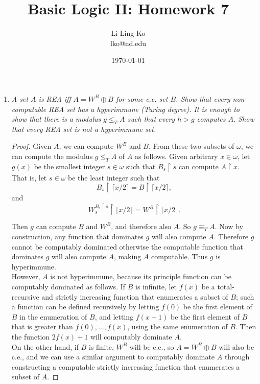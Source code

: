\documentclass{article}
\begin{document}
\title{Basic Logic II: Homework 7}
\author{Li Ling Ko\\ lko@nd.edu}
\date{\today}
\maketitle

\begin{enumerate}
  \item \it A set $A$ is REA iff $A=W^B\oplus B$ for some c.e. set $B$.
    Show that every non-computable REA set has a hyperimmune (Turing
    degree). It is enough to show that there is a modulus $g\leq_TA$ such
    that every $h>g$ computes $A$. Show that every REA set is not a
    hyperimmune set.

    \begin{proof}
      Given $A$, we can compute $W^B$ and $B$. From these two subsets of
      $\omega$, we can compute the modulus $g\leq_T A$ of $A$ as follows.
      Given arbitrary $x\in\omega$, let $g(x)$ be the smallest integer
      $s\in\omega$ such that $B_s\restriction s$ can compute $A\restriction
      x$. That is, let $s\in\omega$ be the least integer such that
      \[B_s\restriction \lceil x/2\rceil =B\restriction \lceil x/2\rceil,\]
      and
      \[W^{B_s\restriction s}_{s} \restriction \lfloor x/2\rfloor
      =W^B \restriction \lfloor x/2\rfloor.\]

      Then $g$ can compute $B$ and $W^B$, and therefore also $A$. So
      $g\equiv_T A$.  Now by construction, any function that dominates $g$
      will also compute $A$. Therefore $g$ cannot be computably dominated
      otherwise the computable function that dominates $g$ will also
      compute $A$, making $A$ computable. Thus $g$ is hyperimmune. \\

      However, $A$ is not hyperimmune, because its principle function can
      be computably dominated as follows. If $B$ is infinite, let $f(x)$ be
      a total-recursive and strictly increasing function that enumerates a
      subset of $B$; such a function can be defined recursively by letting
      $f(0)$ be the first element of $B$ in the enumeration of $B$, and
      letting $f(x+1)$ be the first element of $B$ that is greater than
      $f(0),\ldots,f(x)$, using the same enumeration of $B$. Then the
      function $2f(x)+1$ will computably dominate $A$. \\

      On the other hand, if $B$ is finite, $W^B$ will be c.e., so
      $A=W^B\oplus B$ will also be c.e., and we can use a similar argument
      to computably dominate $A$ through constructing a computable strictly
      increasing function that enumerates a subset of $A$. 
    \end{proof}


\end{enumerate}
\end{document}
